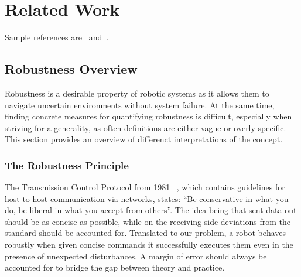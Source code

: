 \setcounter{chapter}{1}

\chapter{Related Work}

Sample references are~\cite{Zwicker04Perspective} and~\cite{Altman89QuaternionScandal}.



\section{Robustness Overview} \label{Robustness Overview}
Robustness is a desirable property of robotic systems as it allows them to navigate uncertain environments without system failure. At the same time, finding concrete measures for quantifying robustness is difficult, especially when striving for a generality, as often definitions are either vague or overly specific.
This section provides an overview of differenct interpretations of the concept. 



\subsection{The Robustness Principle} \label{The Robustness Principle}
The Transmission Control Protocol from 1981 ~\cite{trm}, which contains guidelines for host-to-host communication via networks, states: “Be conservative in what you do, be liberal in what you accept from others”. The idea being that sent data out should be as concise as possible, while on the receiving side deviations from the standard should be accounted for. Translated to our problem, a robot behaves robustly when given concise commands it successfully executes them even in the presence of unexpected disturbances. A margin of error should always be accounted for to bridge the gap between theory and practice.




